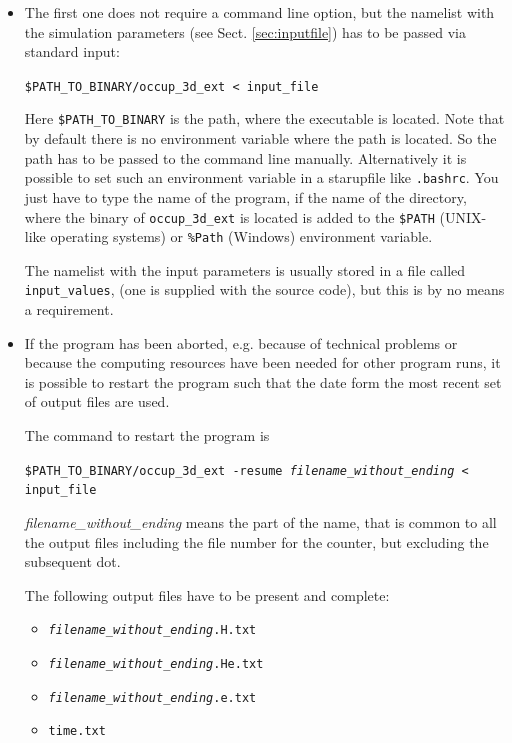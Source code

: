 \documentclass[a4paper,10pt]{article}
\begin{document}
\begin{itemize}
\item The first one does not require a
command line option, but the namelist with the simulation parameters (see Sect. 
\ref{sec:inputfile}) has to be passed via standard input:

\texttt{\$PATH\_TO\_BINARY/occup\_3d\_ext < input\_file}

Here \texttt{\$PATH\_TO\_BINARY} is the path, where the executable is located.  
Note that by default there is no  environment variable where the path is 
located. So the  path has to be passed to the command line manually. 
Alternatively it is possible to set such an environment variable in a 
starupfile like \texttt{.bashrc}. You just have to type the name of the program, 
if the name of the directory, where the binary of \texttt{occup\_3d\_ext} is 
located is added to the \texttt{\$PATH} (UNIX-like operating systems) or 
\texttt{\%Path} (Windows) environment variable. 

The namelist with the input parameters is usually stored in a file  called 
\texttt{input\_values}, (one is supplied with the source code), but this is by 
no means a requirement.

\item If the program has been aborted, e.g. because of technical problems or  
because the computing resources have been needed for other program runs, it is 
possible to restart the program such that the date form the most recent set of 
output files are used.

The command to restart the program is

\texttt{\$PATH\_TO\_BINARY/occup\_3d\_ext -resume \textit{filename\_without\_ending} < input\_file}

\textit{filename\_without\_ending} means the part of the name, that is common to 
all the output files including the file number for the counter, but excluding 
the subsequent dot.

The following output files have to be present and complete:
\begin{itemize}
\item \texttt{\textit{filename\_without\_ending}.H.txt}
\item \texttt{\textit{filename\_without\_ending}.He.txt}
\item \texttt{\textit{filename\_without\_ending}.e.txt}
\item \texttt{time.txt}
\end{itemize}


\end{itemize}
\end{document}

